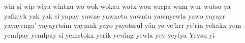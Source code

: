 \documentclass[a4paper]{article}
\begin{document}
win si\hspace{2mm}
wip\hspace{2mm}
wiya\hspace{2mm}
wìntxu\hspace{2mm}
wo\hspace{2mm}
wok\hspace{2mm}
wokau\hspace{2mm}
wotx\hspace{2mm}
wou\hspace{2mm}
wrrpa\hspace{2mm}
wum\hspace{2mm}
wur\hspace{2mm}
wutso\hspace{2mm}
ya\hspace{2mm}
yafkeyk\hspace{2mm}
yak\hspace{2mm}
yak si\hspace{2mm}
yapay\hspace{2mm}
yawne\hspace{2mm}
yawnetu\hspace{2mm}
yawntu\hspace{2mm}
yawnyewla\hspace{2mm}
yawo\hspace{2mm}
yayayr\hspace{2mm}
yayayrnga'\hspace{2mm}
yayayrtsim\hspace{2mm}
yaymak\hspace{2mm}
yayo\hspace{2mm}
yayotsrul\hspace{2mm}
yän\hspace{2mm}
ye\hspace{2mm}
ye'krr\hspace{2mm}
ye'rìn\hspace{2mm}
yehakx\hspace{2mm}
yem\hspace{2mm}
yemfpay\hspace{2mm}
yemfpay si\hspace{2mm}
yemstokx\hspace{2mm}
yerik\hspace{2mm}
yeväng\hspace{2mm}
yewla\hspace{2mm}
yey\hspace{2mm}
yeyfya\hspace{2mm}
Yeysu\hspace{2mm}
yì\hspace{2mm}
\end{document}
